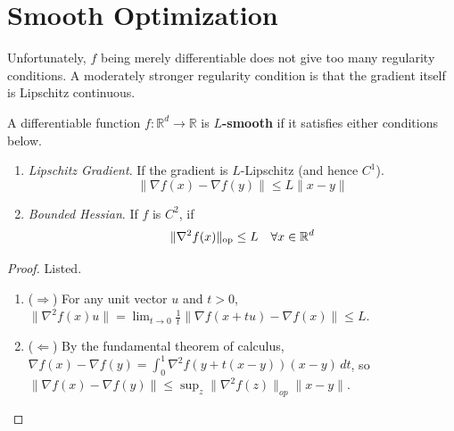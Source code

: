 \section{Smooth Optimization}

	Unfortunately, $f$ being merely differentiable does not give too many regularity conditions. A moderately stronger regularity condition is that the gradient itself is Lipschitz continuous. 

	\begin{definition}[$L$-Smooth]
	  \label{def:l-smooth}
	  A differentiable function $f: \mathbb{R}^d \to \mathbb{R}$ is \textbf{$L$-smooth} if it satisfies either conditions below. 
		\begin{enumerate}
		  \item \textit{Lipschitz Gradient}. If the gradient is $L$-Lipschitz (and hence $C^1$). 
				\begin{equation}
					\| \nabla f(x) - \nabla f(y) \| \leq L \|x - y\|
				\end{equation}

			\item \textit{Bounded Hessian}. If $f$ is $C^2$, if 
				\begin{equation}
					\|\nabla^2 f(x)\|_{\operatorname{op}} \leq L \quad \forall x \in \mathbb{R}^d
				\end{equation}
		\end{enumerate}
	\end{definition}
	\begin{proof}
	  Listed. 
		\begin{enumerate}
			\item ($\Rightarrow$) For any unit vector $u$ and $t > 0$, $\|\nabla^2 f(x) u\| = \lim_{t \to 0} \frac{1}{t}\|\nabla f(x + tu) - \nabla f(x)\| \leq L$. 

		  \item ($\Leftarrow$) By the fundamental theorem of calculus, $\nabla f(x) - \nabla f(y) = \int_0^1 \nabla^2 f(y + t(x - y)) (x - y) \, dt$, so $\|\nabla f(x) - \nabla f(y)\| \leq \sup_z \|\nabla^2 f(z)\|_{op} \|x - y\|$. 
		\end{enumerate}
	\end{proof}

